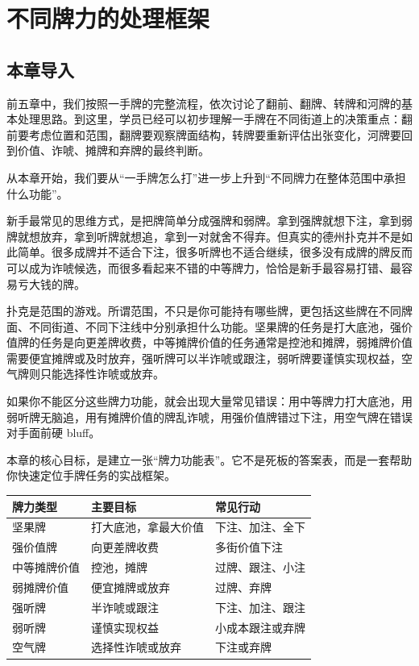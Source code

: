 \chapter{不同牌力的处理框架}

\section{本章导入}

前五章中，我们按照一手牌的完整流程，依次讨论了翻前、翻牌、转牌和河牌的基本处理思路。到这里，学员已经可以初步理解一手牌在不同街道上的决策重点：翻前要考虑位置和范围，翻牌要观察牌面结构，转牌要重新评估出张变化，河牌要回到价值、诈唬、摊牌和弃牌的最终判断。

从本章开始，我们要从“一手牌怎么打”进一步上升到“不同牌力在整体范围中承担什么功能”。

新手最常见的思维方式，是把牌简单分成强牌和弱牌。拿到强牌就想下注，拿到弱牌就想放弃，拿到听牌就想追，拿到一对就舍不得弃。但真实的德州扑克并不是如此简单。很多成牌并不适合下注，很多听牌也不适合继续，很多没有成牌的牌反而可以成为诈唬候选，而很多看起来不错的中等牌力，恰恰是新手最容易打错、最容易亏大钱的牌。

扑克是范围的游戏。所谓范围，不只是你可能持有哪些牌，更包括这些牌在不同牌面、不同街道、不同下注线中分别承担什么功能。坚果牌的任务是打大底池，强价值牌的任务是向更差牌收费，中等摊牌价值的任务通常是控池和摊牌，弱摊牌价值需要便宜摊牌或及时放弃，强听牌可以半诈唬或跟注，弱听牌要谨慎实现权益，空气牌则只能选择性诈唬或放弃。

如果你不能区分这些牌力功能，就会出现大量常见错误：用中等牌力打大底池，用弱听牌无脑追，用有摊牌价值的牌乱诈唬，用强价值牌错过下注，用空气牌在错误对手面前硬 bluff。

本章的核心目标，是建立一张“牌力功能表”。它不是死板的答案表，而是一套帮助你快速定位手牌任务的实战框架。

\begin{center}
\begin{tabular}{lll}
\toprule
\textbf{牌力类型} & \textbf{主要目标} & \textbf{常见行动} \\
\midrule
坚果牌 & 打大底池，拿最大价值 & 下注、加注、全下 \\
强价值牌 & 向更差牌收费 & 多街价值下注 \\
中等摊牌价值 & 控池，摊牌 & 过牌、跟注、小注 \\
弱摊牌价值 & 便宜摊牌或放弃 & 过牌、弃牌 \\
强听牌 & 半诈唬或跟注 & 下注、加注、跟注 \\
弱听牌 & 谨慎实现权益 & 小成本跟注或弃牌 \\
空气牌 & 选择性诈唬或放弃 & 下注或弃牌 \\
\bottomrule
\end{tabular}
\end{center}

